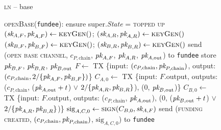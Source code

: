 \begin{figure}[H]
  \begin{processbox}{\textsc{ln} -- base}
    \begin{algorithmic}[1]
      \State \textsc{openBase}(\texttt{fundee}):
      \Indent
        \State ensure super.\textit{State} = \textsc{topped up}
        \State $(\textit{sk}_{A, F}, \textit{pk}_{A, F}) \gets \textsc{keyGen}()$;
        $(\textit{sk}_{A, R}, \textit{pk}_{A, R}) \gets \textsc{keyGen}()$
          \State $(\textit{sk}_{B, F}, \textit{pk}_{B, F}) \gets \textsc{keyGen}()$; $(\textit{sk}_{B, R},
          \textit{pk}_{B, R}) \gets \textsc{keyGen}()$
        \Else \: 
          \State send (\textsc{open base channel}, $c_{P, \mathrm{chain}}$,
          $\textit{pk}_{A, F}$, $\textit{pk}_{A, R}$, $\textit{pk}_{A, \mathrm{out}}$) to \texttt{fundee}
          \State {}
          \State {}
          \State {}
          \State {}
          \State {}
          \State store $\textit{pk}_{B, F}$, $\textit{pk}_{B, R}$, $\textit{pk}_{B, \mathrm{out}}$
        \EndIf
        \State $F \gets$ TX \{input: $(c_{P, \mathrm{chain}}, \textit{pk}_{P,
        \mathrm{chain}})$, output: $(c_{P, \mathrm{chain}}, 2/\{\textit{pk}_{A, F},
        \textit{pk}_{B, F}\})$\}
        \label{code:ln:base:create-funding}
          \State $C_{A, 0} \gets$ TX \{input: $F$.output, outputs: ($c_{P,
          \mathrm{chain}}$, ($\textit{pk}_{A, \mathrm{out}} + t$) $\vee$ $2/\{\textit{pk}_{A, R},
          \textit{pk}_{B, R}\}$), ($0$, $\textit{pk}_{B, \mathrm{out}}$)\}
          \State $C_{B, 0} \gets$ TX \{input: $F$.output, outputs: ($c_{P,
          \mathrm{chain}}$, $\textit{pk}_{A, \mathrm{out}}$), ($0$, ($\textit{pk}_{B,
          \mathrm{out}} + t$) $\vee$ $2/\{\textit{pk}_{A, R}, \textit{pk}_{B, R}\}$)\}
          \State $\mathrm{sig}_{A, C, 0} \gets \textsc{sign}(C_{B, 0}, \textit{sk}_{A,
          F})$
          \State send (\textsc{funding created}, $(c_{P, \mathrm{chain}}, \textit{pk}_{P,
          \mathrm{chain}})$, $\mathrm{sig}_{A, C, 0}$) to \texttt{fundee}
          \State {}
          \State {}
\end{algorithmic}
\end{processbox}
\end{figure}
